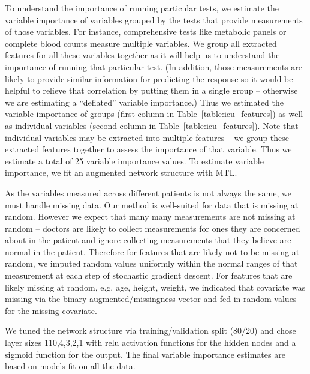 \documentclass{article}
\begin{document}
To understand the importance of running particular tests, we estimate the variable importance of variables grouped by the tests that provide measurements of those variables.
For instance, comprehensive tests like metabolic panels or complete blood counts measure multiple variables.
We group all extracted features for all these variables together as it will help us to understand the importance of running that particular test.
(In addition, those measurements are likely to provide similar information for predicting the response so it would be helpful to relieve that correlation by putting them in a single group -- otherwise we are estimating a ``deflated'' variable importance.)
Thus we estimated the variable importance of groups (first column in Table~\ref{table:icu_features}) as well as individual variables (second column in Table~\ref{table:icu_features}).
Note that individual variables may be extracted into multiple features -- we group these extracted features together to assess the importance of that variable.
Thus we estimate a total of 25 variable importance values.
To estimate variable importance, we fit an augmented network structure with MTL.

As the variables measured across different patients is not always the same, we must handle missing data.
Our method is well-suited for data that is missing at random.
However we expect that many many measurements are not missing at random -- doctors are likely to collect measurements for ones they are concerned about in the patient and ignore collecting measurements that they believe are normal in the patient.
Therefore for features that are likely not to be missing at random, we imputed random values uniformly within the normal ranges of that measurement at each step of stochastic gradient descent.
For features that are likely missing at random, e.g. age, height, weight, we indicated that covariate was missing via the binary augmented/missingness vector and fed in random values for the missing covariate.

We tuned the network structure via training/validation split (80/20) and chose layer sizes 110,4,3,2,1 with relu activation functions for the hidden nodes and a sigmoid function for the output.
The final variable importance estimates are based on models fit on all the data.
\end{document}
